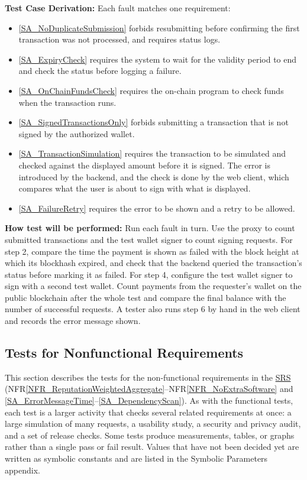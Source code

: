 \documentclass[12pt]{article}
\newcommand{\nfrref}[1]{NFR\ref{#1}}
\newcommand{\saref}[1]{\ref{#1}}
\begin{document}
\begin{enumerate}
\textbf{Test Case Derivation:} Each fault matches one requirement:
\begin{itemize}
\item[1.] \saref{SA_NoDuplicateSubmission} forbids resubmitting before confirming the first transaction was not
processed, and requires status logs.
\item[2.] \saref{SA_ExpiryCheck} requires the system to wait for the validity period to end and check
the status before logging a failure.
\item[3.] \saref{SA_OnChainFundsCheck} requires the on-chain program to check funds when the
transaction runs.
\item[4.] \saref{SA_SignedTransactionsOnly} forbids submitting a transaction that is not signed by the
authorized wallet.
\item[5.] \saref{SA_TransactionSimulation} requires the transaction to be simulated and checked against the
displayed amount before it is signed. The error is introduced by the backend,
and the check is done by the web client, which compares what the user is about
to sign with what is displayed.
\item[6.] \saref{SA_FailureRetry} requires the error to be shown and a retry to be allowed.
\end{itemize}

\textbf{How test will be performed:} Run each fault in turn. Use the proxy to count
submitted transactions and the test wallet signer to count signing requests.
For step 2, compare the time the payment is shown as failed with the block
height at which its blockhash expired, and check that the backend queried the
transaction's status before marking it as failed. For step 4, configure the
test wallet signer to sign with a second test wallet. Count payments from the
requester's wallet on the public blockchain after the whole test and compare the final balance
with the number of successful requests. A tester also runs step 6 by hand in
the web client and records the error message shown.

\end{enumerate}

\subsection{Tests for Nonfunctional Requirements}

This section describes the tests for the non-functional requirements in the
\href{../SRS/SRS.pdf}{SRS} (\nfrref{NFR_ReputationWeightedAggregate}--\nfrref{NFR_NoExtraSoftware} and \saref{SA_ErrorMessageTime}--\saref{SA_DependencyScan}). As with the
functional tests, each test is a larger activity that checks several related
requirements at once: a large simulation of many requests, a usability study, a
security and privacy audit, and a set of release checks. Some tests produce
measurements, tables, or graphs rather than a single pass or fail result.
Values that have not been decided yet are written as symbolic constants and
are listed in the Symbolic Parameters appendix.
\end{document}
